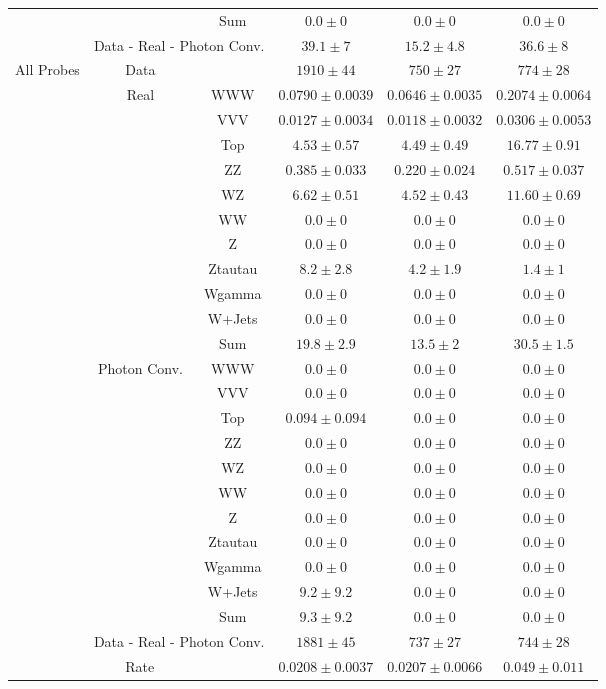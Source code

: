 \begin{tabular}{|c|cc||c|c|c|}
\cline{3-6}
&& Sum &  $0.0 \pm 0$ &  $0.0 \pm 0$ &  $0.0 \pm 0$\\ 
\cline{2-6}
\cline{2-6}
&\multicolumn{2}{|c||}{Data - Real - Photon Conv.} &  $39.1 \pm 7$ &  $15.2 \pm 4.8$ &  $36.6 \pm 8$\\ 
\hline
\hline
\multirow{23}{*}{All Probes}&Data &  & $1910 \pm 44$ &  $750 \pm 27$ &  $774 \pm 28$\\ 
\cline{2-6}
&\multirow{11}{*}{Real}& WWW &  $0.0790 \pm 0.0039$ &  $0.0646 \pm 0.0035$ &  $0.2074 \pm 0.0064$\\ 
&& VVV &  $0.0127 \pm 0.0034$ &  $0.0118 \pm 0.0032$ &  $0.0306 \pm 0.0053$\\ 
&& Top &  $4.53 \pm 0.57$ &  $4.49 \pm 0.49$ &  $16.77 \pm 0.91$\\ 
&& ZZ &  $0.385 \pm 0.033$ &  $0.220 \pm 0.024$ &  $0.517 \pm 0.037$\\ 
&& WZ &  $6.62 \pm 0.51$ &  $4.52 \pm 0.43$ &  $11.60 \pm 0.69$\\ 
&& WW &  $0.0 \pm 0$ &  $0.0 \pm 0$ &  $0.0 \pm 0$\\ 
&& Z &  $0.0 \pm 0$ &  $0.0 \pm 0$ &  $0.0 \pm 0$\\ 
&& Ztautau &  $8.2 \pm 2.8$ &  $4.2 \pm 1.9$ &  $1.4 \pm 1$\\ 
&& Wgamma &  $0.0 \pm 0$ &  $0.0 \pm 0$ &  $0.0 \pm 0$\\ 
&& W+Jets &  $0.0 \pm 0$ &  $0.0 \pm 0$ &  $0.0 \pm 0$\\ 
\cline{3-6}
&& Sum &  $19.8 \pm 2.9$ &  $13.5 \pm 2$ &  $30.5 \pm 1.5$\\ 
\cline{2-6}
\cline{2-6}
&\multirow{11}{*}{Photon Conv.}& WWW &  $0.0 \pm 0$ &  $0.0 \pm 0$ &  $0.0 \pm 0$\\ 
&& VVV &  $0.0 \pm 0$ &  $0.0 \pm 0$ &  $0.0 \pm 0$\\ 
&& Top &  $0.094 \pm 0.094$ &  $0.0 \pm 0$ &  $0.0 \pm 0$\\ 
&& ZZ &  $0.0 \pm 0$ &  $0.0 \pm 0$ &  $0.0 \pm 0$\\ 
&& WZ &  $0.0 \pm 0$ &  $0.0 \pm 0$ &  $0.0 \pm 0$\\ 
&& WW &  $0.0 \pm 0$ &  $0.0 \pm 0$ &  $0.0 \pm 0$\\ 
&& Z &  $0.0 \pm 0$ &  $0.0 \pm 0$ &  $0.0 \pm 0$\\ 
&& Ztautau &  $0.0 \pm 0$ &  $0.0 \pm 0$ &  $0.0 \pm 0$\\ 
&& Wgamma &  $0.0 \pm 0$ &  $0.0 \pm 0$ &  $0.0 \pm 0$\\ 
&& W+Jets &  $9.2 \pm 9.2$ &  $0.0 \pm 0$ &  $0.0 \pm 0$\\ 
\cline{3-6}
&& Sum &  $9.3 \pm 9.2$ &  $0.0 \pm 0$ &  $0.0 \pm 0$\\ 
\cline{2-6}
\cline{2-6}
&\multicolumn{2}{|c||}{Data - Real - Photon Conv.} &  $1881 \pm 45$ &  $737 \pm 27$ &  $744 \pm 28$\\ 
\hline
\hline
\multicolumn{3}{|c||}{Rate} &  $0.0208 \pm 0.0037$ &  $0.0207 \pm 0.0066$ &  $0.049 \pm 0.011$\\ 
\hline
\end{tabular}
